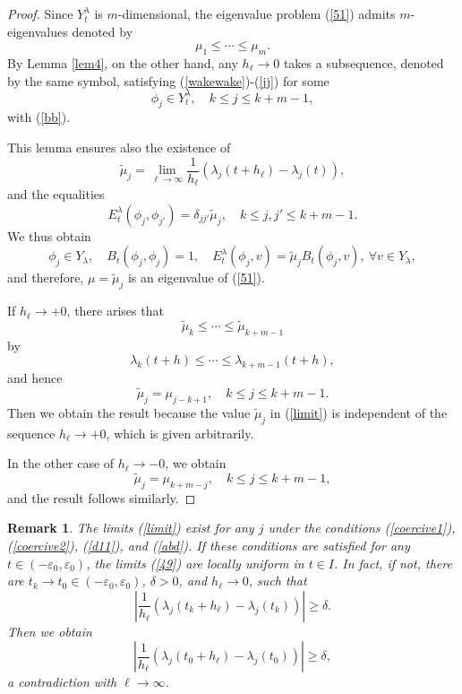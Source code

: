 \documentclass[final,a4paper]{jmsj}
\theoremstyle{thmstyleone}%
\theoremstyle{thmstyletwo}%
\newtheorem{remark}{Remark}%
\theoremstyle{thmstylethree}%
\begin{document}
\begin{proof} 
Since $Y_t^\lambda$ is $m$-dimensional, the eigenvalue problem (\ref{51}) admits $m$-eigenvalues denoted by   
\[ \mu_1\leq \cdots \leq \mu_m. \] 
By Lemma \ref{lem4}, on the other hand, any $h_\ell\rightarrow 0$ takes a subsequence, denoted by the same symbol, satisfying (\ref{wakewake})-(\ref{jj}) for some 
\[ \phi_j\in Y_t^\lambda, \quad k\leq j\leq k+m-1, \] 
with (\ref{bb}). 

This lemma ensures also the existence of  
\begin{equation} 
\tilde \mu_j=\lim_{\ell\rightarrow\infty}\frac{1}{h_\ell}(\lambda_j(t+h_\ell)-\lambda_j(t)),  
 \label{limit}
\end{equation} 
and the equalities 
\begin{equation} 
E^\lambda_t(\phi_j, \phi_{j'})=\delta_{jj'}\tilde \mu_j, \quad k\leq j, j' \leq k+m-1. 
 \label{68}
\end{equation} 
We thus obtain    
\[ \phi_j\in Y_\lambda, \quad B_{t}(\phi_j, \phi_j)=1, \quad E^\lambda_{t}(\phi_j,v)=\tilde \mu_jB_{t}(\phi_j, v), \ \forall v\in Y_\lambda, \] 
and therefore, $\mu=\tilde \mu_j$ is an eigenvalue of (\ref{51}). 

If $h_\ell\rightarrow +0$, there arises that  
\[ \tilde \mu_k\leq \cdots \leq \tilde \mu_{k+m-1} \] 
by  
\[ \lambda_{k}(t+h)\leq \cdots \leq \lambda_{k+m-1}(t+h),  \] 
and hence 
\[ \tilde \mu_j=\mu_{j-k+1}, \quad k\leq j\leq k+m-1. \] 
Then we obtain the result because the value $\tilde \mu_j$ in (\ref{limit}) is independent of the sequence $h_\ell\rightarrow +0$, which is given arbitrarily. 

In the other case of $h_\ell\rightarrow -0$, we obtain 
\[ \tilde\mu_j=\mu_{k+m-j}, \quad k\leq j\leq k+m-1,  \] 
and the result follows similarly. 
\end{proof} 

\begin{remark}\label{uniform1} 
The limits (\ref{limit}) exist for any $j$ under the conditions (\ref{coercive1}), (\ref{coercive2}), (\ref{d11}), and  (\ref{abd}). If these conditions are satisfied for any $t\in (-\varepsilon_0, \varepsilon_0)$, the limits (\ref{49}) are locally uniform in $t\in I$. In fact, if not, there are $t_k\rightarrow t_0\in (-\varepsilon_0, \varepsilon_0)$, $\delta>0$, and $h_\ell\rightarrow 0$, such that 
\[ \left\vert \frac{1}{h_\ell}(\lambda_j(t_k+h_\ell)-\lambda_j(t_k))\right\vert \geq \delta. \] 
Then we obtain 
\[ \left\vert \frac{1}{h_\ell}(\lambda_j(t_0+h_\ell)-\lambda_j(t_0))\right\vert \geq \delta, \]
a contradiction with $\ell\rightarrow \infty$. 
\end{remark} 
\end{document}
